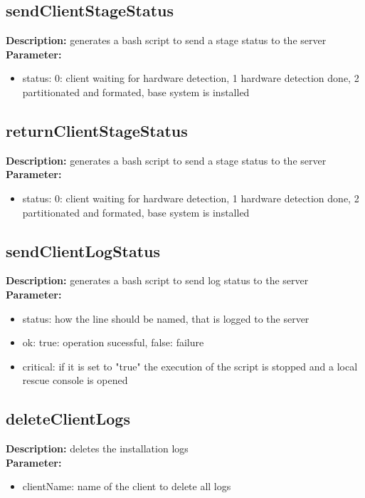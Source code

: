 \subsection{sendClientStageStatus}
\textbf{Description:} generates a bash script to send a stage status to the server\\
\textbf{Parameter:}
\begin{itemize}
\item status: 0: client waiting for hardware detection, 1 hardware detection done, 2 partitionated and formated, base system is installed
\end{itemize}

\subsection{returnClientStageStatus}
\textbf{Description:} generates a bash script to send a stage status to the server\\
\textbf{Parameter:}
\begin{itemize}
\item status: 0: client waiting for hardware detection, 1 hardware detection done, 2 partitionated and formated, base system is installed
\end{itemize}

\subsection{sendClientLogStatus}
\textbf{Description:} generates a bash script to send log status to the server\\
\textbf{Parameter:}
\begin{itemize}
\item status: how the line should be named, that is logged to the server
\item ok: true: operation sucessful, false: failure
\item critical: if it is set to "true" the execution of the script is stopped and a local rescue console is opened
\end{itemize}

\subsection{deleteClientLogs}
\textbf{Description:} deletes the installation logs\\
\textbf{Parameter:}
\begin{itemize}
\item clientName: name of the client to delete all logs
\end{itemize}

